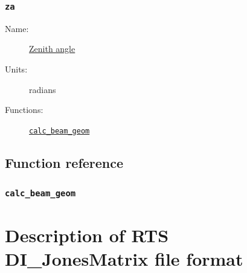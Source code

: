 \documentclass{book}
\begin{document}
\subsection{\texttt{za}}
\begin{description}
    \item[Name:] \hyperlink{sec:coordslocalsky}{Zenith angle}
    \item[Units:] radians
    \item[Functions:] \hyperlink{cn:calc_beam_geom}{\texttt{calc\_beam\_geom}}
\end{description}

\section{Function reference}

\subsection{\texttt{calc\_beam\_geom}}
\label{fcn:calc_beam_geom}

\appendix

\chapter{Description of RTS DI\_JonesMatrix file format}
\end{document}
